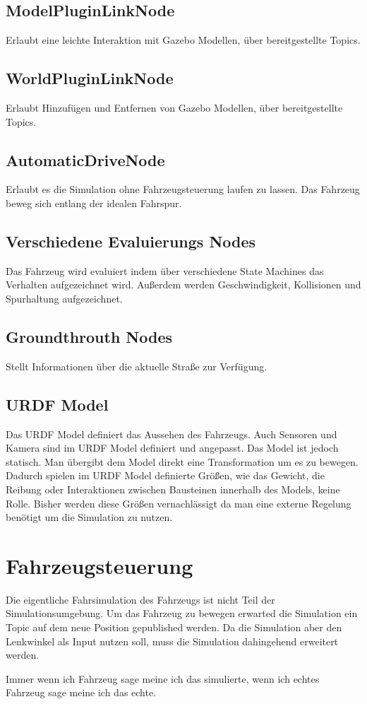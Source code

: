 \subsection*{ModelPluginLinkNode}
Erlaubt eine leichte Interaktion mit Gazebo Modellen, über bereitgestellte Topics.
\cite{KITcar:gazeboSimulationPackage}
\subsection*{WorldPluginLinkNode}
Erlaubt Hinzufügen und Entfernen von Gazebo Modellen, über bereitgestellte Topics.
\cite{KITcar:gazeboSimulationPackage}
\subsection*{AutomaticDriveNode}
Erlaubt es die Simulation ohne Fahrzeugsteuerung laufen zu lassen. 
Das Fahrzeug beweg sich entlang der idealen Fahrspur. 
\cite{KITcar:gazeboSimulationPackage}
\subsection*{Verschiedene Evaluierungs Nodes}
Das Fahrzeug wird evaluiert indem über verschiedene State Machines das Verhalten aufgezeichnet wird.
Außerdem werden Geschwindigkeit, Kollisionen und Spurhaltung aufgezeichnet.
\cite{KITcar:simulation_evaluation}
\subsection*{Groundthrouth Nodes}
Stellt Informationen über die aktuelle Straße zur Verfügung.
\cite{KITcar:simulation_groundtruth}
\subsection*{URDF Model}
Das URDF Model definiert das Aussehen des Fahrzeugs.
Auch Sensoren und Kamera sind im URDF Model definiert und angepasst.
Das Model ist jedoch statisch. 
Man übergibt dem Model direkt eine Transformation um es zu bewegen.
Dadurch spielen im URDF Model definierte Größen, wie das Gewicht, die Reibung oder Interaktionen zwischen Bausteinen innerhalb des Models, keine Rolle.
Bisher werden diese Größen vernachlässigt da man eine externe Regelung benötigt um die Simulation zu nutzen.
\cite{KITcar:gazeboSimulationPackage}

\section{Fahrzeugsteuerung}

Die eigentliche Fahrsimulation des Fahrzeugs ist nicht Teil der Simulationsumgebung.
Um das Fahrzeug zu bewegen erwarted die Simulation ein Topic auf dem neue Position gepublished werden.
Da die Simulation aber den Lenkwinkel als Input nutzen soll, muss die Simulation dahingehend erweitert werden.



Immer wenn ich Fahrzeug sage meine ich das simulierte, wenn ich echtes Fahrzeug sage meine ich das echte.
